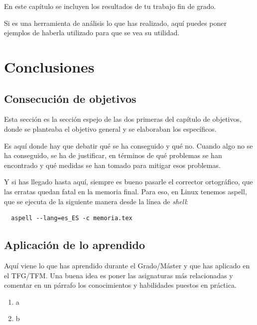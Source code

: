 \documentclass[a4paper, 12pt]{book}
\begin{document}
En este capítulo se incluyen los resultados de tu trabajo fin de grado.

Si es una herramienta de análisis lo que has realizado, aquí puedes poner ejemplos de haberla utilizado para que se vea su utilidad.



\cleardoublepage
\chapter{Conclusiones}
\label{chap:conclusiones}


\section{Consecución de objetivos}
\label{sec:consecucion-objetivos}

Esta sección es la sección espejo de las dos primeras del capítulo de objetivos, donde se planteaba el objetivo general y se elaboraban los específicos.

Es aquí donde hay que debatir qué se ha conseguido y qué no.
Cuando algo no se ha conseguido, se ha de justificar, en términos de qué problemas se han encontrado y qué medidas se han tomado para mitigar esos problemas.

Y si has llegado hasta aquí, siempre es bueno pasarle el corrector ortográfico, que las erratas quedan fatal en la memoria final.
Para eso, en Linux tenemos aspell, que se ejecuta de la siguiente manera desde la línea de \emph{shell}:

\begin{verbatim}
  aspell --lang=es_ES -c memoria.tex
\end{verbatim}

\section{Aplicación de lo aprendido}
\label{sec:aplicacion}

Aquí viene lo que has aprendido durante el Grado/Máster y que has aplicado en el TFG/TFM. Una buena idea es poner las asignaturas más relacionadas y comentar en un párrafo los conocimientos y habilidades puestos en práctica.

\begin{enumerate}
  \item a
  \item b
\end{enumerate}
\end{document}

